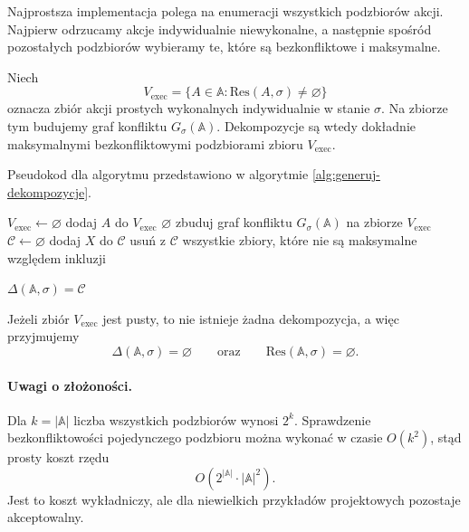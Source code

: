\documentclass[11pt,a4paper]{article}
\theoremstyle{definition}
\begin{document}
Najprostsza implementacja polega na enumeracji wszystkich podzbiorów akcji. Najpierw odrzucamy akcje indywidualnie niewykonalne, a następnie spośród pozostałych podzbiorów wybieramy te, które są bezkonfliktowe i maksymalne.

Niech
\[
V_{\mathrm{exec}} = \{A \in \mathbb{A} : \mathrm{Res}(A,\sigma)\neq\varnothing\}
\]
oznacza zbiór akcji prostych wykonalnych indywidualnie w stanie $\sigma$. Na zbiorze tym budujemy graf konfliktu $G_{\sigma}(\mathbb{A})$. Dekompozycje są wtedy dokładnie maksymalnymi bezkonfliktowymi podzbiorami zbioru $V_{\mathrm{exec}}$.

Pseudokod dla algorytmu przedstawiono w algorytmie \ref{alg:generuj-dekompozycje}.

\begin{algorithm}[H]
\caption{Pseudokod dla algorytmu generującego dekompozycje}
\label{alg:generuj-dekompozycje}
\begin{algorithmic}[1]
        \State $V_{\mathrm{exec}} \leftarrow \varnothing$
                \State dodaj $A$ do $V_{\mathrm{exec}}$
            \EndIf
        \EndFor
            \Return $\varnothing$
        \EndIf
        \State zbuduj graf konfliktu $G_{\sigma}(\mathbb{A})$ na zbiorze $V_{\mathrm{exec}}$
        \State $\mathcal{C} \leftarrow \varnothing$
                \State dodaj $X$ do $\mathcal{C}$
            \EndIf
        \EndFor
        \State usuń z $\mathcal{C}$ wszystkie zbiory, które nie są maksymalne względem inkluzji
        
        \Return $\Delta(\mathbb{A},\sigma) = \mathcal{C}$
    \EndProcedure
\end{algorithmic}
\end{algorithm}

Jeżeli zbiór $V_{\mathrm{exec}}$ jest pusty, to nie istnieje żadna dekompozycja, a więc przyjmujemy
\[
\Delta(\mathbb{A},\sigma)=\varnothing
\qquad\text{oraz}\qquad
\mathrm{Res}(\mathbb{A},\sigma)=\varnothing.
\]

\paragraph{Uwagi o złożoności.}
Dla $k=|\mathbb{A}|$ liczba wszystkich podzbiorów wynosi $2^k$. Sprawdzenie bezkonfliktowości pojedynczego podzbioru można wykonać w czasie $O(k^2)$, stąd prosty koszt rzędu
\[
O(2^{|\mathbb{A}|} \cdot |\mathbb{A}|^2).
\]
Jest to koszt wykładniczy, ale dla niewielkich przykładów projektowych pozostaje akceptowalny.
\end{document}
